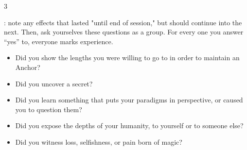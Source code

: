 \begin{multicols}{3}
  \vspace{-.1in}

  \begin{move}
    : note any effects that lasted "until end of session," but should continue into the next. Then, ask yourselves these questions as a group. For every one you answer “yes” to, everyone marks experience.

    \vspace{-.1in}
    
    \begin{itemize}
      \small
      \setlength\itemsep{-0.25em}
    \item Did you show the lengths you were willing to go to in order to maintain an Anchor?
    \item Did you uncover a secret?
    \item Did you learn something that puts your paradigms in perspective, or caused you to question them?
    \item Did you expose the depths of your humanity, to yourself or to someone else?
    \item Did you witness loss, selfishness, or pain born of magic?
    \end{itemize}
  \end{move}
  
\end{multicols}
